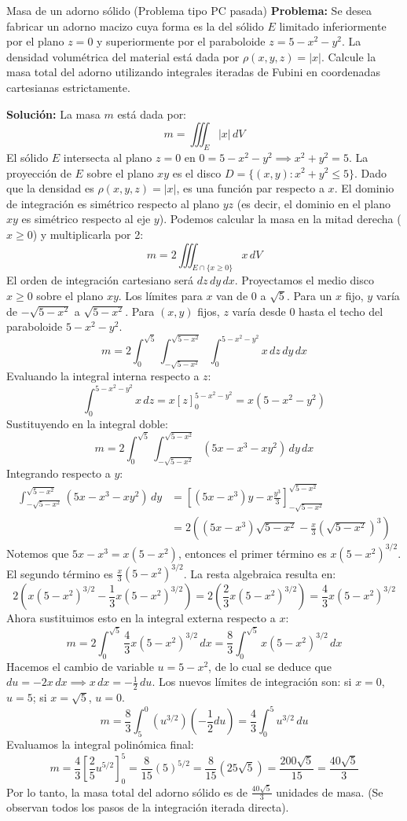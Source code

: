 \documentclass[11pt,a4paper]{article}
\begin{document}
\begin{ejerciciobox}{Masa de un adorno sólido (Problema tipo PC pasada)}
\textbf{Problema:} Se desea fabricar un adorno macizo cuya forma es la del sólido $E$ limitado inferiormente por el plano $z=0$ y superiormente por el paraboloide $z = 5 - x^2 - y^2$. La densidad volumétrica del material está dada por $\rho(x,y,z) = |x|$. Calcule la masa total del adorno utilizando integrales iteradas de Fubini en coordenadas cartesianas estrictamente.

\textbf{Solución:}
La masa $m$ está dada por:
\[ m = \iiint_E |x| \,dV \]
El sólido $E$ intersecta al plano $z=0$ en $0 = 5 - x^2 - y^2 \implies x^2 + y^2 = 5$. La proyección de $E$ sobre el plano $xy$ es el disco $D = \{(x,y) : x^2 + y^2 \leq 5\}$.
Dado que la densidad es $\rho(x,y,z) = |x|$, es una función par respecto a $x$. El dominio de integración es simétrico respecto al plano $yz$ (es decir, el dominio en el plano $xy$ es simétrico respecto al eje $y$).
Podemos calcular la masa en la mitad derecha ($x \geq 0$) y multiplicarla por 2:
\[ m = 2 \iiint_{E \cap \{x \geq 0\}} x \,dV \]
El orden de integración cartesiano será $dz\,dy\,dx$. Proyectamos el medio disco $x \geq 0$ sobre el plano $xy$. Los límites para $x$ van de $0$ a $\sqrt{5}$. Para un $x$ fijo, $y$ varía de $-\sqrt{5-x^2}$ a $\sqrt{5-x^2}$. Para $(x,y)$ fijos, $z$ varía desde $0$ hasta el techo del paraboloide $5-x^2-y^2$.
\[ m = 2 \int_{0}^{\sqrt{5}} \int_{-\sqrt{5-x^2}}^{\sqrt{5-x^2}} \int_{0}^{5-x^2-y^2} x \,dz\,dy\,dx \]
Evaluando la integral interna respecto a $z$:
\[ \int_{0}^{5-x^2-y^2} x \,dz = x \left[ z \right]_0^{5-x^2-y^2} = x(5-x^2-y^2) \]
Sustituyendo en la integral doble:
\[ m = 2 \int_{0}^{\sqrt{5}} \int_{-\sqrt{5-x^2}}^{\sqrt{5-x^2}} (5x - x^3 - xy^2) \,dy\,dx \]
Integrando respecto a $y$:
\begin{align*}
\int_{-\sqrt{5-x^2}}^{\sqrt{5-x^2}} (5x - x^3 - xy^2) \,dy &= \left[ (5x-x^3)y - x \frac{y^3}{3} \right]_{-\sqrt{5-x^2}}^{\sqrt{5-x^2}} \\
&= 2 \left( (5x-x^3)\sqrt{5-x^2} - \frac{x}{3}(\sqrt{5-x^2})^3 \right)
\end{align*}
Notemos que $5x-x^3 = x(5-x^2)$, entonces el primer término es $x(5-x^2)^{3/2}$.
El segundo término es $\frac{x}{3}(5-x^2)^{3/2}$.
La resta algebraica resulta en:
\[ 2 \left( x(5-x^2)^{3/2} - \frac{1}{3}x(5-x^2)^{3/2} \right) = 2 \left( \frac{2}{3}x(5-x^2)^{3/2} \right) = \frac{4}{3}x(5-x^2)^{3/2} \]
Ahora sustituimos esto en la integral externa respecto a $x$:
\[ m = 2 \int_{0}^{\sqrt{5}} \frac{4}{3}x(5-x^2)^{3/2} \,dx = \frac{8}{3} \int_{0}^{\sqrt{5}} x(5-x^2)^{3/2} \,dx \]
Hacemos el cambio de variable $u = 5-x^2$, de lo cual se deduce que $du = -2x \,dx \implies x \,dx = -\frac{1}{2} \,du$.
Los nuevos límites de integración son: si $x=0$, $u=5$; si $x=\sqrt{5}$, $u=0$.
\[ m = \frac{8}{3} \int_{5}^{0} (u^{3/2}) \left(-\frac{1}{2} du\right) = \frac{4}{3} \int_{0}^{5} u^{3/2} \,du \]
Evaluamos la integral polinómica final:
\[ m = \frac{4}{3} \left[ \frac{2}{5} u^{5/2} \right]_0^5 = \frac{8}{15} (5)^{5/2} = \frac{8}{15} (25\sqrt{5}) = \frac{200\sqrt{5}}{15} = \frac{40\sqrt{5}}{3} \]
Por lo tanto, la masa total del adorno sólido es de $\frac{40\sqrt{5}}{3}$ unidades de masa. 
(Se observan todos los pasos de la integración iterada directa).
\end{ejerciciobox}
\end{document}

